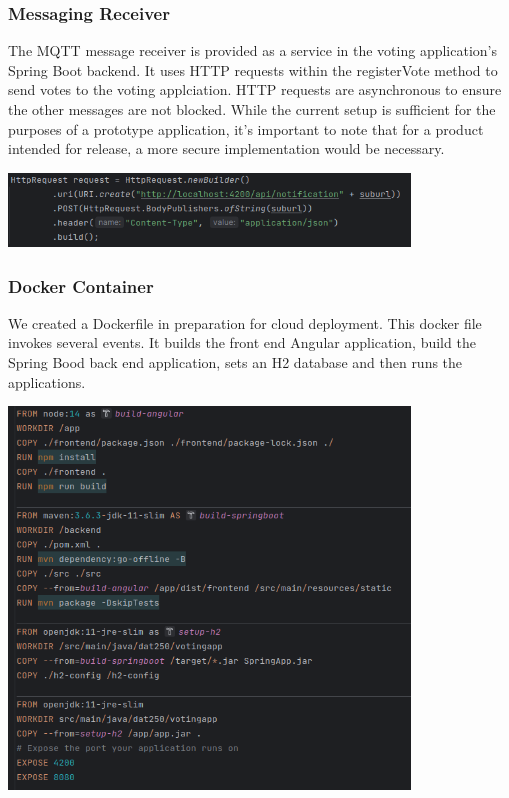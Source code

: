 \subsubsection{Messaging Receiver}
The MQTT message receiver is provided as a service in the voting application's Spring Boot backend.  It uses HTTP requests within the registerVote method to send votes to the voting applciation.  HTTP requests are asynchronous to ensure the other messages are not blocked.   While the current setup is sufficient for the purposes of a prototype application, it's important to note that for a product intended for release, a more secure implementation would be necessary.

  \begin{center}
  \includegraphics[width=0.80\textwidth]{figs/mqtt_publish.png}
  \end{center}

\subsubsection{Docker Container}
We created a Dockerfile in preparation for cloud deployment. This docker file invokes several events.  It builds the front end Angular application, build the Spring Bood back end application, sets an H2 database and then runs the applications.  

  \begin{center}
  \includegraphics[width=0.80\textwidth]{figs/dockerfile.png}
  \end{center}
